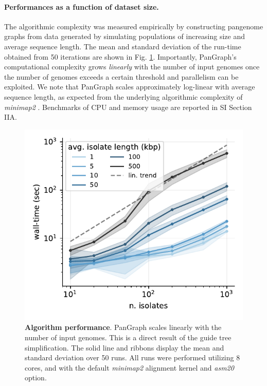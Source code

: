 \documentclass[aps,rmp,reprint,superscriptaddress,notitlepage,10pt]{revtex4-1}
\begin{document}
\paragraph*{Performances as a function of dataset size.}
The algorithmic complexity was measured empirically by constructing pangenome graphs from data generated by simulating populations of increasing size and average sequence length.
The mean and standard deviation of the run-time obtained from 50 iterations are shown in Fig. \ref{fig:toy-performance}.
Importantly, PanGraph's computational complexity grows \emph{linearly} with the number of input genomes once the number of genomes exceeds a certain threshold and parallelism can be exploited.
We note that PanGraph scales approximately log-linear with average sequence length, as expected from the underlying algorithmic complexity of \textit{minimap2} \cite{li2018minimap2}.
Benchmarks of CPU and memory usage are reported in SI Section IIA.

\begin{figure}[tb]
    \includegraphics[width=.4\textwidth]{figs/benchmark.pdf}
    \caption{{\bf Algorithm performance}.
        PanGraph scales linearly with the number of input genomes.
        This is a direct result of the guide tree simplification.
        The solid line and ribbons display the mean and standard deviation over 50 runs.
        All runs were performed utilizing 8 cores, and with the default \textit{minimap2} alignment kernel and \textit{asm20} option.
    }
    \label{fig:toy-performance}
\end{figure}
\end{document}
